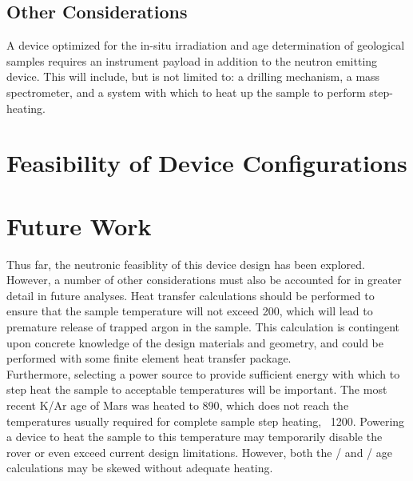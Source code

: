 \documentclass{mc2015}
\begin{document}
\subsection{Other Considerations}

A device optimized for the in-situ irradiation and age determination of geological samples requires an instrument payload in addition to the neutron emitting device. This will include, but is not limited to: a drilling mechanism, a mass spectrometer, and a system with which to heat up the sample to perform step-heating. 

\section{Feasibility of Device Configurations}
\label{sec:feasibility}

\section{Future Work}
\label{sec:future}

Thus far, the neutronic feasiblity of this device design has been explored. However, a number of other considerations must also be accounted for in greater detail in future analyses. Heat transfer calculations should be performed to ensure that the sample temperature will not exceed 200\celsius, which will lead to premature release of trapped argon in the sample. This calculation is contingent upon concrete knowledge of the design materials and geometry, and could be performed with some finite element heat transfer package. \\

Furthermore, selecting a power source to provide sufficient energy with which to step heat the sample to acceptable temperatures will be important. The most recent K/Ar age of Mars was heated to 890\celsius \cite{farley_situ_2014}, which does not reach the temperatures usually required for complete sample step heating, ~1200\celsius \cite{mcdougall_geochronology_1999}. Powering a device to heat the sample to this temperature may temporarily disable the rover or even exceed current design limitations. However, both the /  and /  age calculations may be skewed without adequate heating. \\
\end{document}
